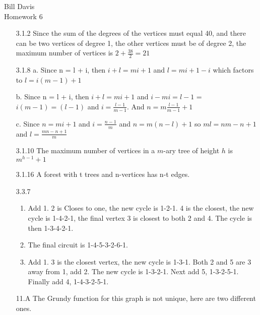 \documentclass{article}
\begin{document}
Bill Davis\\
Homework 6

\begin{enumerate}

\item[3.1.2]
Since the sum of the degrees of the vertices must equal 40, and there can be two vertices of degree 1, the other vertices must be of degree 2, the maximum number of vertices is $2 + \frac{38}{2} = 21$

\item[3.1.8]
a. Since n = l + i, then $i+l = mi+1$ and $l = mi+1-i$ which factors to $l=i(m-1)+1$

b. Since n = l + i, then $i+l = mi+1$ and $i-mi=l-1$ = $i(m-1) = (l-1)$ and $i=\frac{l-1}{m-1}$. And $n=m\frac{l-1}{m-1} + 1$

c. Since $n = mi+1$ and $i=\frac{n-1}{m}$ and $n=m(n-l)+1$ so $ml=nm-n+1$ and $l=\frac{mn-n+1}{m}$

\item[3.1.10]
The maximum number of vertices in a $m$-ary tree of height $h$ is $m^{h-1}+1$

\item[3.1.16]
A forest with t trees and n-vertices has n-t edges. 

\item[3.3.7]
\begin{enumerate}
\item Add 1. 2 is Closes to one, the new cycle is 1-2-1. 4 is the closest, the new cycle is 1-4-2-1, the final vertex 3 is closest to both 2 and 4. The cycle is then 1-3-4-2-1. 
\item
The final circuit is 1-4-5-3-2-6-1. 
\item
Add 1. 3 is the closest vertex, the new cycle is 1-3-1. Both 2 and 5 are 3 away from 1, add 2. The new cycle is 1-3-2-1. Next add 5, 1-3-2-5-1. Finally add 4, 1-4-3-2-5-1. 
\end{enumerate}

\item[11.A]
The Grundy function for this graph is not unique, here are two different ones. 



\end{enumerate}
\end{document}
